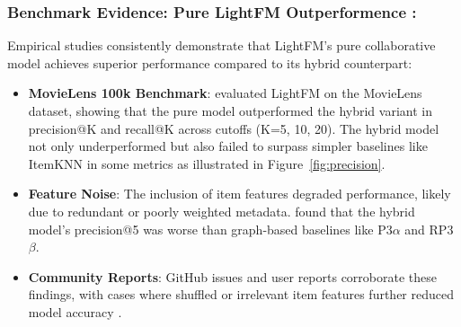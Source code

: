 \subsubsection{Benchmark Evidence: Pure LightFM Outperformence :}
Empirical studies consistently demonstrate that LightFM's pure collaborative model achieves superior performance compared to its hybrid counterpart:
\begin{itemize}
    \item \textbf{MovieLens 100k Benchmark}: \cite{shu2023lightfm} evaluated LightFM on the MovieLens dataset, showing that the pure model outperformed the hybrid variant in precision@K and recall@K across cutoffs (K=5, 10, 20). The hybrid model not only underperformed but also failed to surpass simpler baselines like ItemKNN in some metrics as illustrated in Figure~\ref{fig:precision}.

    \item \textbf{Feature Noise}: The inclusion of item features degraded performance, likely due to redundant or poorly weighted metadata. \cite{shu2023lightfm} found that the hybrid model's precision@5 was worse than graph-based baselines like P3$\alpha$ and RP3$\beta$.
    \item \textbf{Community Reports}: GitHub issues and user reports corroborate these findings, with cases where shuffled or irrelevant item features further reduced model accuracy \cite{lightfmissues}.
\end{itemize}
